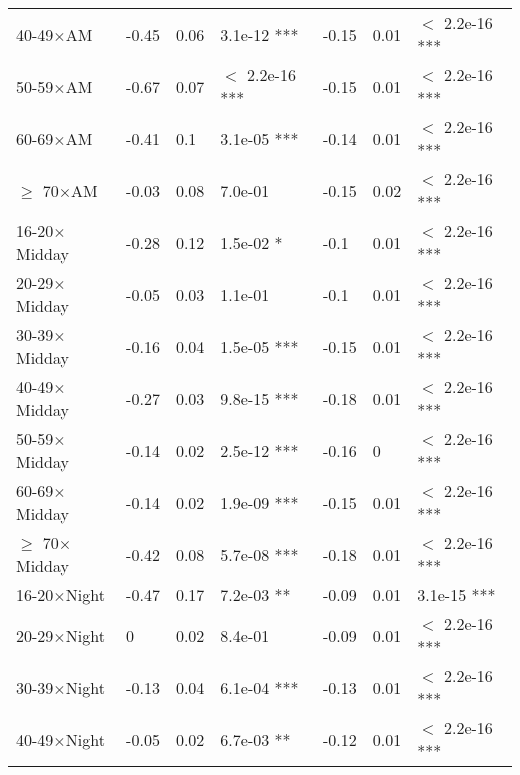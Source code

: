 \documentclass{article}\usepackage[utf8]{inputenc}
\begin{document}
\begin{longtable}[t]{lllllll}
\hspace{1em}40-49$\times$AM & -0.45 & 0.06 & 3.1e-12 *** & -0.15 & 0.01 & $<$ 2.2e-16 ***\\
\hspace{1em}50-59$\times$AM & -0.67 & 0.07 & $<$ 2.2e-16 *** & -0.15 & 0.01 & $<$ 2.2e-16 ***\\
\hspace{1em}60-69$\times$AM & -0.41 & 0.1 & 3.1e-05 *** & -0.14 & 0.01 & $<$ 2.2e-16 ***\\
\hspace{1em}$\geq$ 70$\times$AM & -0.03 & 0.08 & 7.0e-01 & -0.15 & 0.02 & $<$ 2.2e-16 ***\\
\hspace{1em}16-20$\times$Midday & -0.28 & 0.12 & 1.5e-02 * & -0.1 & 0.01 & $<$ 2.2e-16 ***\\
\hspace{1em}20-29$\times$Midday & -0.05 & 0.03 & 1.1e-01 & -0.1 & 0.01 & $<$ 2.2e-16 ***\\
\hspace{1em}30-39$\times$Midday & -0.16 & 0.04 & 1.5e-05 *** & -0.15 & 0.01 & $<$ 2.2e-16 ***\\
\hspace{1em}40-49$\times$Midday & -0.27 & 0.03 & 9.8e-15 *** & -0.18 & 0.01 & $<$ 2.2e-16 ***\\
\hspace{1em}50-59$\times$Midday & -0.14 & 0.02 & 2.5e-12 *** & -0.16 & 0 & $<$ 2.2e-16 ***\\
\hspace{1em}60-69$\times$Midday & -0.14 & 0.02 & 1.9e-09 *** & -0.15 & 0.01 & $<$ 2.2e-16 ***\\
\hspace{1em}$\geq$ 70$\times$Midday & -0.42 & 0.08 & 5.7e-08 *** & -0.18 & 0.01 & $<$ 2.2e-16 ***\\
\hspace{1em}16-20$\times$Night & -0.47 & 0.17 & 7.2e-03 ** & -0.09 & 0.01 & 3.1e-15 ***\\
\hspace{1em}20-29$\times$Night & 0 & 0.02 & 8.4e-01 & -0.09 & 0.01 & $<$ 2.2e-16 ***\\
\hspace{1em}30-39$\times$Night & -0.13 & 0.04 & 6.1e-04 *** & -0.13 & 0.01 & $<$ 2.2e-16 ***\\
\hspace{1em}40-49$\times$Night & -0.05 & 0.02 & 6.7e-03 ** & -0.12 & 0.01 & $<$ 2.2e-16 ***\\

\end{longtable}
\end{document}
